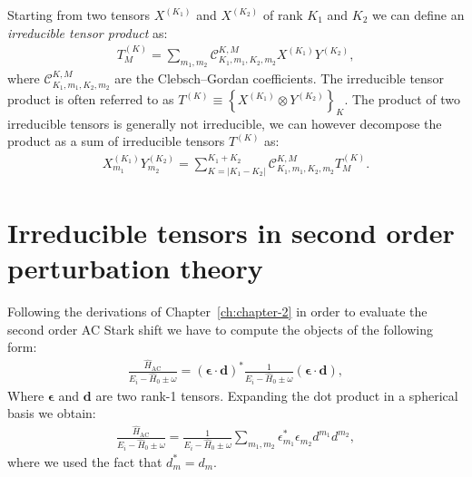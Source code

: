 Starting from two tensors $X^{\left(K_1\right)}$ and $X^{\left(K_2\right)}$ of rank $K_1$ and $K_2$ we can define an \emph{irreducible tensor product} as:
\begin{align}
	T^{\left(K\right)}_M = \sum\limits_{m_1,m_2}\mathcal{C}^{K,M}_{K_1, m_1,K_2,m_2}X^{\left(K_1\right)}Y^{\left(K_2\right)},
	\label{eq:irred_tens_prod}
\end{align}
where $\mathcal{C}^{K,M}_{K_1, m_1,K_2,m_2}$ are the Clebsch–Gordan coefficients. The irreducible tensor product is often referred to as $T^{\left(K\right)} \equiv \left\{X^{\left(K_1\right)}\otimes Y^{\left(K_2\right)}\right\}_K$. The product of two irreducible tensors is generally not irreducible, we can however decompose the product as a sum of irreducible tensors $T^{\left(K\right)}$ as:
\begin{align}
	X^{\left(K_1\right)}_{m_1}Y^{\left(K_2\right)}_{m_2} = \sum\limits_{K = \lvert K_1 - K_2\rvert}^{K_1+K_2}\mathcal{C}^{K,M}_{K_1, m_1,K_2,m_2}T^{\left(K\right)}_M.
	\label{eq:irrep_tensor_prod}
\end{align}

\section{Irreducible tensors in second order perturbation theory}

Following the derivations of Chapter~\ref{ch:chapter-2} in order to evaluate the second order AC Stark shift we have to compute the objects of the following form\cite{Rosenbusch:2009}: 
\begin{align}
	\frac{\hat{H}_{\mathrm{AC}}}{E_i - \hat{H}_0\pm \omega} = \left(\boldsymbol{\epsilon}\cdot\mathbf{d}\right)^*\frac{1}{E_i - \hat{H}_0\pm \omega}\left(\boldsymbol{\epsilon}\cdot\mathbf{d}\right),
\end{align}
Where $\boldsymbol{\epsilon}$ and $\mathbf{d}$ are two rank-1 tensors. Expanding the dot product in a spherical basis we obtain:
\begin{align}
	\frac{\hat{H}_{\mathrm{AC}}}{E_i - \hat{H}_0\pm \omega} = \frac{1}{E_i - \hat{H}_0\pm \omega} \sum\limits_{m_1,m_2} \epsilon^*_{m_1}\epsilon_{m_2}d^{m_1}d^{m_2},
	\label{eq:red_acShift}
\end{align}
where we used the fact that $d_m^* = d_m$.

